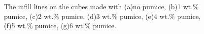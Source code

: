 \begin{figure}[htbp]
{\begin{minipage}[t]{0.2\textwidth}
		\end{minipage}
	}
  \caption[The infill lines on the cubes]{\footnotesize The infill lines on the cubes made with (a)no pumice, (b)1 wt.$\%$ pumice, (c)2 wt.$\%$ pumice, (d)3 wt.$\%$ pumice, (e)4 wt.$\%$ pumice, (f)5 wt.$\%$ pumice, (g)6 wt.$\%$ pumice.}
  \label{Fig:cube layer}
\end{figure}
